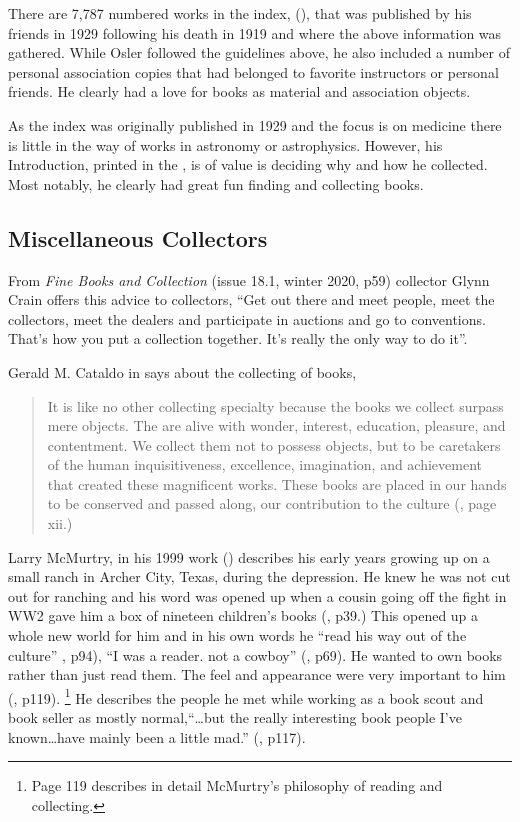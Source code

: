 \documentclass[letterpaper]{article}
\begin{document}
There are 7,787 numbered works in the index,  (\cite{Francis2000}), that was published by his friends
in 1929 following his death in 1919 and where the above information
was gathered.  While Osler followed the guidelines above, he also
included a number of personal association copies that had belonged to
favorite instructors or personal friends. He clearly had a love for
books as material and association objects.

As the index was originally published in 1929 and the focus is on
medicine there is little in the way of  works in astronomy or
astrophysics.  However, his Introduction, printed in the
, is of value is deciding why and how he
collected. Most notably, he clearly had great fun finding and
collecting books.


\subsection{Miscellaneous Collectors}

From {\itshape Fine Books and Collection} (issue 18.1, winter 2020,
p59) collector Glynn Crain offers this advice to collectors, ``Get out
there and meet people, meet the collectors, meet the dealers and
participate in auctions and go to conventions. That's how you put a
collection together. It's really the only way to do it''.

Gerald M. Cataldo in  says about the
collecting of books,
\begin{quotation}
  It is like no other collecting specialty because the books we collect
  surpass mere objects. The are alive with wonder, interest, education,
  pleasure, and contentment. We collect them not to possess objects, but
  to be caretakers of the human inquisitiveness, excellence, imagination,
  and achievement that created these magnificent works. These books are
  placed in our hands to be conserved and passed along, our contribution
  to the culture (\cite{Cataldo2010}, page xii.)
\end{quotation}

Larry McMurtry, in his 1999 work  (\cite{McMurtry1999}) describes his early years growing up on
a small ranch in Archer City, Texas, during the depression.  He knew
he was not cut out for ranching and his word was opened up when a
cousin going off the fight in WW2 gave him a box of nineteen
children's books (\cite{McMurtry1999}, p39.) This opened up a whole
new world for him and in his own words he ``read his way out of the
culture'' \cite{McMurtry1999}, p94), ``I was a reader. not a cowboy''
(\cite{McMurtry1999}, p69). He wanted to own books rather than just
read them. The feel and appearance were very important to him
(\cite{McMurtry1999}, p119). \footnote{Page 119 describes in detail
  McMurtry's philosophy of reading and collecting.}  He describes the
people he met while working as a book scout and book seller as mostly
normal,``\ldots but the really interesting book people I've
known\ldots have mainly been a little mad.'' (\cite{McMurtry1999},
p117).
\end{document}

